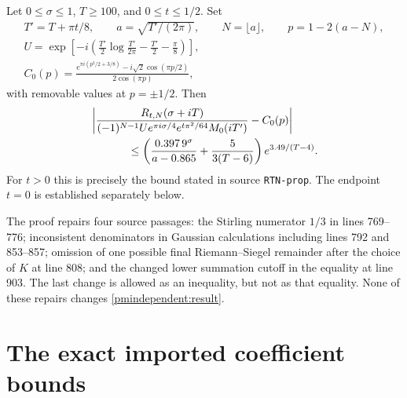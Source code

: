 \begin{pmindependenttheorem}\label{pmindependent:main}
Let $0\le\sigma\le1$, $T\ge100$, and $0\le t\le1/2$. Set
\begin{gather*}
 T'=T+\pi t/8,\qquad a=\sqrt{T'/(2\pi)},\qquad N=\lfloor a\rfloor,
 \qquad p=1-2(a-N),\\
 U=\exp\!\left[-i\left(\frac{T'}2\log\frac{T'}{2\pi}
                   -\frac{T'}2-\frac\pi8\right)\right],\\
 C_0(p)=\frac{e^{\pi i(p^2/2+3/8)}-i\sqrt2\cos(\pi p/2)}{2\cos(\pi p)},
\end{gather*}
with removable values at $p=\pm1/2$. Then
\begin{align}\label{pmindependent:result}
 &\left|\frac{R_{t,N}(\sigma+iT)}
 {(-1)^{N-1}Ue^{\pi i\sigma/4}e^{t\pi^2/64}M_0(iT')}-C_0(p)\right|\\
 &\hspace{12mm}\le
 \left(\frac{0.397\,9^\sigma}{a-0.865}+\frac5{3(T-6)}\right)
                      e^{3.49/(T-4)}.\nonumber
\end{align}
For $t>0$ this is precisely the bound stated in source
\texttt{RTN-prop}. The endpoint $t=0$ is established separately below.
\end{pmindependenttheorem}

The proof repairs four source passages: the Stirling numerator $1/3$
in lines 769--776; inconsistent denominators in Gaussian calculations
including lines 792 and 853--857; omission of one possible final
Riemann--Siegel remainder after the choice of $K$ at line 808; and the
changed lower summation cutoff in the equality at line 903. The
last change is allowed as an inequality, but not as that equality.
None of these repairs changes \eqref{pmindependent:result}.

\section{The exact imported coefficient bounds}

